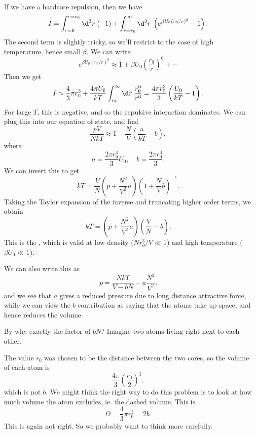 \documentclass[a4paper]{article}
\begin{document}
If we have a hardcore repulsion, then we have
\[
  I = \int_{r = 0}^{r = r_0} \d^3 r\; (-1) + \int_{r = r_0}^\infty \d^3 r\; \left(e^{\beta U_0 (r_0/r)^6} - 1\right).
\]
The second term is slightly tricky, so we'll restrict to the case of high temperature, hence small $\beta$. We can write
\[
  e^{\beta U_0 (r_0/r)^6} \approx 1 + \beta U_0 \left(\frac{r_0}{r}\right)^6 + \cdots
\]
Then we get
\[
  I \approx \frac{4}{3}\pi r_0^3 +\frac{4 \pi U_0}{kT} \int_{r_0}^\infty \d r\; \frac{r_0^6}{r^6} = \frac{4\pi r_0^3}{3}\left(\frac{U_0}{kT} - 1\right).
\]
For large $T$, this is negative, and so the repulsive interaction dominates. We can plug this into our equation of state, and find
\[
  \frac{pV}{NkT} \approx 1 - \frac{N}{V}\left(\frac{a}{kT} - b\right),
\]
where
\[
  a = \frac{2\pi r_0^3}{3}U_0,\quad b = \frac{2\pi r_0^3}{3}.
\]
We can invert this to get
\[
  kT = \frac{V}{N}\left(p + \frac{N^2}{V^2} a\right) \left(1 + \frac{N}{V}b\right)^{-1}.
\]
Taking the Taylor expansion of the inverse and truncating higher order terms, we obtain
\[
  kT = \left(p + \frac{N^2}{V^2}a \right)\left(\frac{V}{N} - b\right).
\]
This is the , which is valid at low density ($Nr_0^3/V \ll 1$) and high temperature ($\beta U_0 \ll 1$).

We can also write this as
\[
  p = \frac{NkT}{V - bN} - a \frac{N^2}{V^2}.
\]
and we see that $a$ gives a reduced pressure due to long distance attractive force, while we can view the $b$ contribution as saying that the atoms take up space, and hence reduces the volume.

By why exactly the factor of $bN$? Imagine two atoms living right next to each other.
\begin{center}
\end{center}
The value $r_0$ was chosen to be the distance between the two cores, so the volume of each atom is
\[
  \frac{4\pi}{3}\left(\frac{r_0}{2}\right)^3,
\]
which is not $b$. We might think the right way to do this problem is to look at how much volume the atom excludes, ie. the dashed volume. This is
\[
  \Omega = \frac{4}{3}\pi r_0^3 = 2b.
\]
This is again not right. So we probably want to think more carefully.
\end{document}
